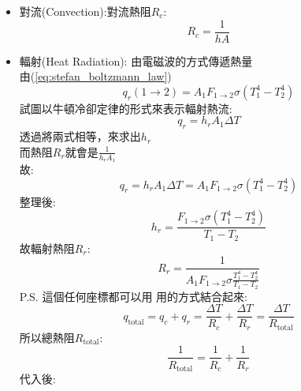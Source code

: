 \documentclass[../main.tex]{subfiles}
\begin{document}
\begin{itemize}
\begin{itemize}
\begin{itemize}
\begin{itemize}
            \begin{equation}
              R_k = \frac{r_o-r_i}{4\pi k r_or_i}
            \end{equation}
        \end{itemize}
    \end{itemize}
    \item 對流(Convection):對流熱阻$R_c$:
      \begin{equation}
        R_c = \frac{1}{hA} \label{eq:thermal_resistance_convection}
      \end{equation}
    \item 輻射(Heat Radiation): 由電磁波的方式傳遞熱量\\
      由(\ref{eq:stefan_boltzmann_law})
      \begin{equation}
        q_r(1\to 2) = A_1 F_{1\to 2} \sigma \left(T_1^4 - T_2^4\right)
      \end{equation}
      試圖以牛頓冷卻定律的形式來表示輻射熱流:
      \begin{equation}
        q_r = h_r A_1 \Delta T
      \end{equation}
      透過將兩式相等，來求出$h_r$\\
      而熱阻$R_r$就會是$\frac{1}{h_r A_1}$\\
      故:
      \begin{equation}
        q_r = h_r A_1 \Delta T = A_1 F_{1\to 2} \sigma \left(T_1^4 - T_2^4\right)
      \end{equation}
      整理後:
      \begin{equation}
        h_r = \frac{F_{1\to 2} \sigma \left(T_1^4 - T_2^4\right)}{T_1 - T_2}
      \end{equation}
      故輻射熱阻$R_r$:
      \begin{equation}
        \boxed{R_r = \frac{1}{A_1 F_{1\to 2} \sigma \frac{T_1^4 - T_2^4}{T_1 - T_2}}} \label{eq:thermal_resistance_radiation}
      \end{equation}
      P.S. 這個任何座標都可以用
      用的方式結合起來:
      \begin{equation}
        q_{\text{total}} = q_c + q_r = \frac{\Delta T}{R_c} + \frac{\Delta T}{R_r} = \frac{\Delta T}{R_{\text{total}}}
      \end{equation}
      所以總熱阻$R_{\text{total}}$:
      \begin{equation}
        \frac{1}{R_{\text{total}}} = \frac{1}{R_c} + \frac{1}{R_r}
      \end{equation}
      代入後:
      \begin{equation}

\end{equation}
\end{itemize}
\end{itemize}
\end{document}
